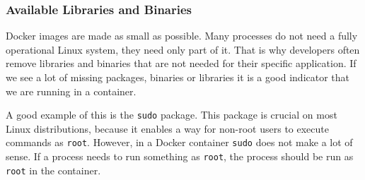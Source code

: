 \subsubsection{Available Libraries and Binaries}
Docker images are made as small as possible. Many processes do not need a fully operational Linux system, they need only part of it. That is why developers often remove libraries and binaries that are not needed for their specific application. If we see a lot of missing packages, binaries or libraries it is a good indicator that we are running in a container.

A good example of this is the \lstinline{sudo} package. This package is crucial on most Linux distributions, because it enables a way for non-root users to execute commands as \lstinline{root}. However, in a Docker container \lstinline{sudo} does not make a lot of sense. If a process needs to run something as \lstinline{root}, the process should be run as \lstinline{root} in the container.
